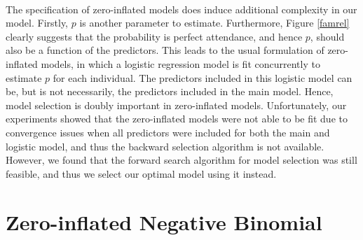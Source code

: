\documentclass[12pt, titlepage]{article}
\begin{document}
	\paragraph{} The specification of zero-inflated models does induce additional complexity in our model. Firstly, $p$ is another parameter to estimate. Furthermore, Figure \ref{famrel} clearly suggests that the probability is perfect attendance, and hence $p$, should also be a function of the predictors. This leads to the usual formulation of zero-inflated models, in which a logistic regression model is fit concurrently to estimate $p$ for each individual. The predictors included in this logistic model can be, but is not necessarily, the predictors included in the main model. Hence, model selection is doubly important in zero-inflated models. Unfortunately, our experiments showed that the zero-inflated models were not able to be fit due to convergence issues when all predictors were included for both the main and logistic model, and thus the backward selection algorithm is not available. However, we found that the forward search algorithm for model selection was still feasible, and thus we select our optimal model using it instead. 
	\section{Zero-inflated Negative Binomial} 
	
\end{document}
